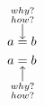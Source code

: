 \documentclass[../../latex]{subfiles}
\begin{document}
\begin{align}
  a \overset{
    \mathclap{
      \substack{
  why?          \\
  how?          \\
        \big \downarrow
      }
    }
  }{=} b        \\
  a \underset{
    \mathclap{
      \substack{
  \big \uparrow \\
  why?          \\
        how?
      }
    }
  }{=} b
\end{align}
\end{document}
